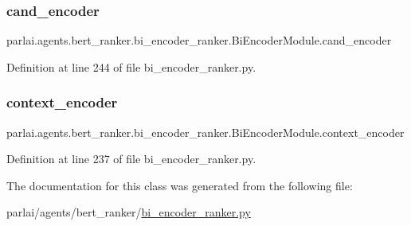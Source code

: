 \subsubsection{\texorpdfstring{cand\+\_\+encoder}{cand\_encoder}}
{\footnotesize\ttfamily parlai.\+agents.\+bert\+\_\+ranker.\+bi\+\_\+encoder\+\_\+ranker.\+Bi\+Encoder\+Module.\+cand\+\_\+encoder}



Definition at line 244 of file bi\+\_\+encoder\+\_\+ranker.\+py.

\mbox{\label{classparlai_1_1agents_1_1bert__ranker_1_1bi__encoder__ranker_1_1BiEncoderModule_aa92bf5d244fe4f11ea2211353d7aad6f}} 
\subsubsection{\texorpdfstring{context\+\_\+encoder}{context\_encoder}}
{\footnotesize\ttfamily parlai.\+agents.\+bert\+\_\+ranker.\+bi\+\_\+encoder\+\_\+ranker.\+Bi\+Encoder\+Module.\+context\+\_\+encoder}



Definition at line 237 of file bi\+\_\+encoder\+\_\+ranker.\+py.



The documentation for this class was generated from the following file\+:\begin{DoxyCompactItemize}
\item 
parlai/agents/bert\+\_\+ranker/\hyperlink{bi__encoder__ranker_8py}{bi\+\_\+encoder\+\_\+ranker.\+py}\end{DoxyCompactItemize}
